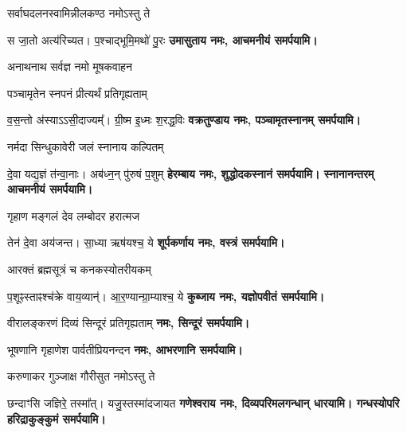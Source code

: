 \begin{center}
{सर्वाघदलनस्वामिन्नीलकण्ठ नमोऽस्तु ते}

{स जा॒तो अत्य॑रिच्यत। प॒श्चाद्भूमि॒मथो॑ पु॒रः}
\textbf{उमासुताय नमः, आचमनीयं समर्पयामि।}
\medskip

{अनाथनाथ सर्वज्ञ नमो मूषकवाहन}

{पञ्चामृतेन स्नपनं प्रीत्यर्थं प्रतिगृह्यताम्}

{व॒स॒न्तो अ॑स्याऽऽसी॒दाज्यम्᳚। ग्री॒ष्म इ॒ध्मः श॒रद्ध॒विः}
\textbf{वक्रतुण्डाय नमः, पञ्चामृतस्नानम् समर्पयामि।}
\medskip

{नर्मदा सिन्धुकावेरी जलं स्नानाय कल्पितम्}

{दे॒वा यद्य॒ज्ञं त॑न्वा॒नाः। अब॑ध्न॒न् पु॑रुषं प॒शुम्}
\textbf{हेरम्बाय नमः, शुद्धोदकस्नानं समर्पयामि। स्नानानन्तरम् आचमनीयं समर्पयामि।}
\medskip

{गृहाण मङ्गलं देव लम्बोदर हरात्मज}

{तेन॑ दे॒वा अय॑जन्त। सा॒ध्या ऋष॑यश्च॒ ये}
\textbf{शूर्पकर्णाय नमः, वस्त्रं समर्पयामि।}
\medskip

{आरक्तं ब्रह्मसूत्रं च कनकस्योतरीयकम्}

{प॒शूꣴस्ताꣴश्च॑क्रे वाय॒व्यान्॑। आ॒र॒ण्यान्ग्रा॒म्याश्च॒ ये}
\textbf{कुब्जाय नमः, यज्ञोपवीतं समर्पयामि।}
\medskip

{वीरालङ्करणं दिव्यं सिन्दूरं प्रतिगृह्यताम्}
\textbf{\devAya{} नमः, सिन्दूरं समर्पयामि।}\footnotemark
\medskip

{भूषणानि गृहाणेश पार्वतीप्रियनन्दन}
\textbf{\devAya{} नमः, आभरणानि समर्पयामि।}\footnotemark[\value{footnote}]
\medskip

{करुणाकर गुञ्जाक्ष गौरीसुत नमोऽस्तु ते}

{छन्दाꣳसि जज्ञिरे॒ तस्मा᳚त्। यजु॒स्तस्मा॑दजायत}
\textbf{गणेश्वराय नमः, दिव्यपरिमलगन्धान् धारयामि। गन्धस्योपरि हरिद्राकुङ्कुमं समर्पयामि।}
\medskip


\end{center}
